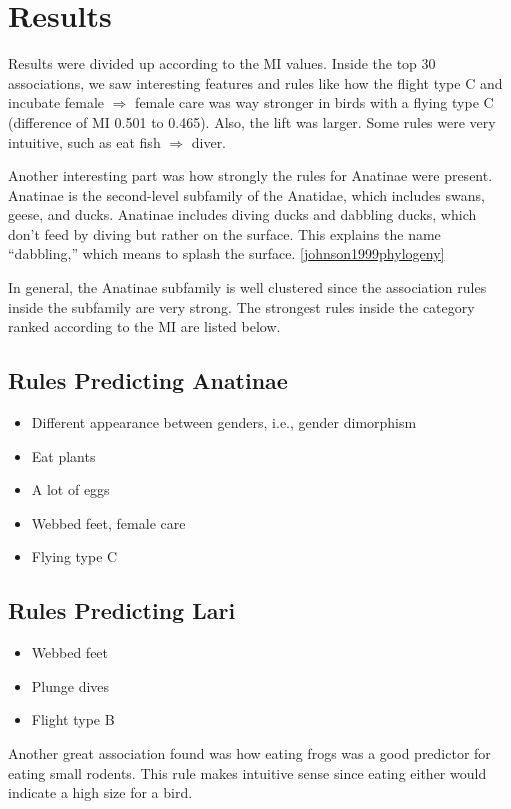 \section{Results}

Results were divided up according to the MI values. Inside the top 30 associations, we saw interesting features and rules like how the flight type C and incubate female $\Rightarrow$ female care was way stronger in birds with a flying type C (difference of MI 0.501 to 0.465). Also, the lift was larger. Some rules were very intuitive, such as eat fish $\Rightarrow$ diver.

Another interesting part was how strongly the rules for Anatinae were present. Anatinae is the second-level subfamily of the Anatidae, which includes swans, geese, and ducks. Anatinae includes diving ducks and dabbling ducks, which don't feed by diving but rather on the surface. This explains the name ``dabbling,'' which means to splash the surface. \autoref{johnson1999phylogeny}

In general, the Anatinae subfamily is well clustered since the association rules inside the subfamily are very strong. The strongest rules inside the category ranked according to the MI are listed below.

\subsection{Rules Predicting Anatinae}
\begin{itemize}
    \item Different appearance between genders, i.e., gender dimorphism
    \item Eat plants
    \item A lot of eggs
    \item Webbed feet, female care
    \item Flying type C
\end{itemize}

\subsection{Rules Predicting Lari}
\begin{itemize}
    \item Webbed feet
    \item Plunge dives
    \item Flight type B
\end{itemize}

Another great association found was how eating frogs was a good predictor for eating small rodents. This rule makes intuitive sense since eating either would indicate a high size for a bird.


